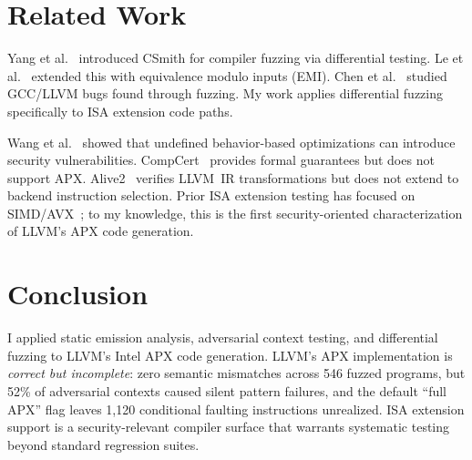 \documentclass[acmsmall,nonacm]{acmart}
\begin{document}
\section{Related Work}

Yang et al.~\cite{yang2011csmith} introduced CSmith for compiler
fuzzing via differential testing. Le et al.~\cite{le2014emi} extended
this with equivalence modulo inputs (EMI). Chen et
al.~\cite{chen2016empirical} studied GCC/LLVM bugs found through
fuzzing. My work applies differential fuzzing specifically to ISA
extension code paths.

Wang et al.~\cite{wang2013towards} showed that undefined
behavior-based optimizations can introduce security vulnerabilities.
CompCert~\cite{leroy2009compcert} provides formal guarantees but does
not support APX. Alive2~\cite{lopes2021alive2} verifies LLVM~IR
transformations but does not extend to backend instruction selection.
Prior ISA extension testing has focused on
SIMD/AVX~\cite{taneja2020testing}; to my knowledge, this is the
first security-oriented characterization of LLVM's APX code
generation.


\section{Conclusion}

I applied static emission analysis, adversarial context testing, and
differential fuzzing to LLVM's Intel APX code generation. LLVM's APX
implementation is \emph{correct but incomplete}: zero semantic
mismatches across 546 fuzzed programs, but 52\% of adversarial
contexts caused silent pattern failures, and the default ``full APX''
flag leaves 1,120 conditional faulting instructions unrealized. ISA
extension support is a security-relevant compiler surface that
warrants systematic testing beyond standard regression suites.



\end{document}
